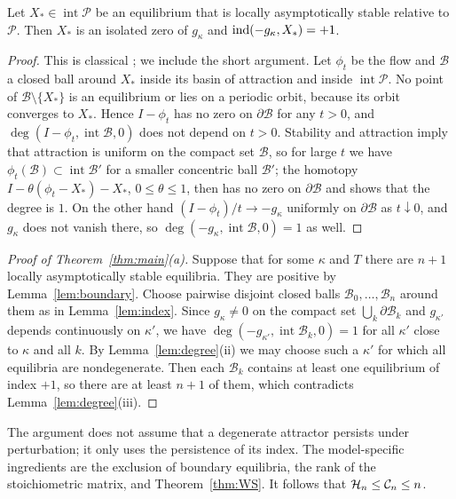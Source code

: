\begin{lemma}\label{lem:index}
Let \(X_*\in\operatorname{int}\mathcal P\) be an equilibrium that is locally asymptotically
stable relative to \(\mathcal P\). Then \(X_*\) is an isolated zero of \(g_\kappa\) and
\(\operatorname{ind}(-g_\kappa,X_*)=+1\).
\end{lemma}
\begin{proof}
This is classical \cite{KrasnoselskiiZabreiko}; we include the short argument. Let \(\phi_t\)
be the flow and \(\mathcal B\) a closed ball around \(X_*\) inside its basin of attraction and
inside \(\operatorname{int}\mathcal P\). No point of \(\mathcal B\setminus\{X_*\}\) is an
equilibrium or lies on a periodic orbit, because its orbit converges to \(X_*\). Hence
\(I-\phi_t\) has no zero on \(\partial\mathcal B\) for any \(t>0\), and
\(\deg(I-\phi_t,\operatorname{int}\mathcal B,0)\) does not depend on \(t>0\). Stability and
attraction imply that attraction is uniform on the compact set \(\mathcal B\), so for large
\(t\) we have \(\phi_t(\mathcal B)\subset\operatorname{int}\mathcal B'\) for a smaller
concentric ball \(\mathcal B'\); the homotopy \(I-\theta(\phi_t-X_*)-X_*\),
\(0\le\theta\le1\), then has no zero on \(\partial\mathcal B\) and shows that the degree is
\(1\). On the other hand \((I-\phi_t)/t\to-g_\kappa\) uniformly on \(\partial\mathcal B\) as
\(t\downarrow0\), and \(g_\kappa\) does not vanish there, so
\(\deg(-g_\kappa,\operatorname{int}\mathcal B,0)=1\) as well.
\end{proof}

\begin{proof}[Proof of Theorem~\ref{thm:main}\textup{(a)}]
Suppose that for some \(\kappa\) and \(T\) there are \(n+1\) locally asymptotically stable
equilibria. They are positive by Lemma~\ref{lem:boundary}. Choose pairwise disjoint closed balls
\(\mathcal B_0,\dots,\mathcal B_n\) around them as in Lemma~\ref{lem:index}. Since
\(g_\kappa\ne0\) on the compact set \(\bigcup_k\partial\mathcal B_k\) and \(g_{\kappa'}\) depends
continuously on \(\kappa'\), we have
\(\deg(-g_{\kappa'},\operatorname{int}\mathcal B_k,0)=1\) for all \(\kappa'\) close to \(\kappa\)
and all \(k\). By Lemma~\ref{lem:degree}(ii) we may choose such a \(\kappa'\) for which all
equilibria are nondegenerate. Then each \(\mathcal B_k\) contains at least one equilibrium of
index \(+1\), so there are at least \(n+1\) of them, which contradicts
Lemma~\ref{lem:degree}(iii).
\end{proof}

The argument does not assume that a degenerate attractor persists under perturbation; it only
uses the persistence of its index. The model-specific ingredients are the exclusion of boundary
equilibria, the rank of the stoichiometric matrix, and Theorem~\ref{thm:WS}. It follows that
\(\mathcal H_n\le\mathcal C_n\le n\).

